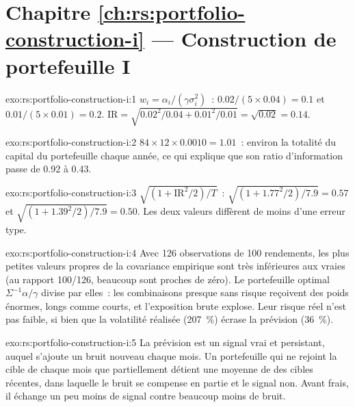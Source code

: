 \section*{Chapitre \ref{ch:rs:portfolio-construction-i} --- Construction de portefeuille I}

\begin{solution}{exo:rs:portfolio-construction-i:1}
$w_i = \alpha_i/(\gamma\sigma_i^2)$~: $0.02/(5 \times 0.04) = 0.1$ et $0.01/(5 \times 0.01) = 0.2$. $\mathrm{IR} = \sqrt{0.02^2/0.04 + 0.01^2/0.01} = \sqrt{0.02} = 0.14$.
\end{solution}

\begin{solution}{exo:rs:portfolio-construction-i:2}
$84 \times 12 \times 0.0010 = 1.01$~: environ la totalité du capital du portefeuille chaque année, ce qui explique que son ratio d'information passe de 0.92 à 0.43.
\end{solution}

\begin{solution}{exo:rs:portfolio-construction-i:3}
$\sqrt{(1 + \mathrm{IR}^2/2)/T}$~: $\sqrt{(1 + 1.77^2/2)/7.9} = 0.57$ et $\sqrt{(1 + 1.39^2/2)/7.9} = 0.50$. Les deux valeurs diffèrent de moins d'une erreur type.
\end{solution}

\begin{solution}{exo:rs:portfolio-construction-i:4}
Avec 126 observations de 100 rendements, les plus petites valeurs propres de la covariance empirique sont très inférieures aux vraies (au rapport 100/126, beaucoup sont proches de zéro). Le
portefeuille optimal $\Sigma^{-1}\alpha/\gamma$ divise par elles~: les combinaisons presque sans risque  reçoivent des poids énormes, longs comme courts, et l'exposition brute explose.
Leur risque réel n'est pas faible, si bien que la volatilité réalisée (207~\%) écrase la prévision (36~\%).
\end{solution}

\begin{solution}{exo:rs:portfolio-construction-i:5}
La prévision est un signal vrai et persistant, auquel s'ajoute un bruit nouveau chaque mois. Un portefeuille qui ne rejoint la cible de chaque mois que partiellement détient une moyenne de
des cibles récentes, dans laquelle le bruit se compense en partie et le signal non. Avant frais, il échange un peu moins de signal contre beaucoup moins de bruit.
\end{solution}

